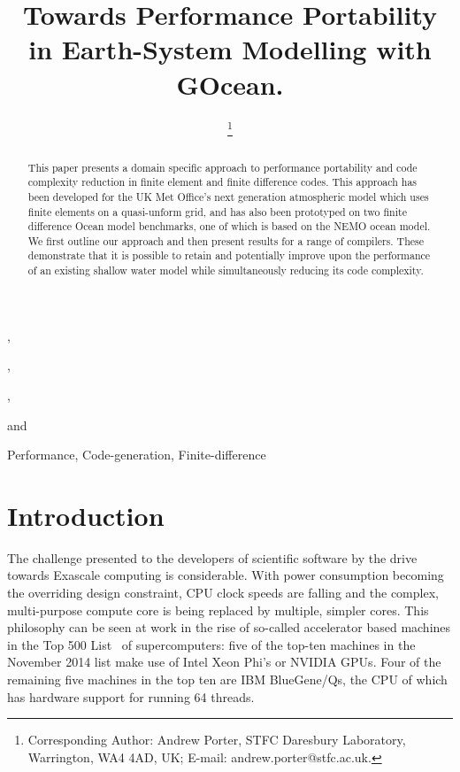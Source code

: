 \documentclass{IOS-Book-Article}
\def\hb{\hbox to 10.7 cm{}}
\begin{document}
\pagestyle{headings}
\def\thepage{}

\begin{frontmatter}              %

\title{Towards Performance Portability in Earth-System Modelling with GOcean.}

\markboth{}{November 2015\hb}

\author[A]{ %
\thanks{Corresponding Author: Andrew Porter, STFC Daresbury Laboratory, Warrington, WA4 4AD, UK; E-mail:
andrew.porter@stfc.ac.uk.}},
\author[A]{ },
\author[A]{ },
\author[A]{ }
and
\author[B]{ }
\address[A]{STFC Daresbury Laboratory, Warrington, WA4 4AD, UK}
\address[B]{IBM}

\begin{abstract}
This paper presents a domain specific approach to performance
portability and code complexity reduction in finite element and finite
difference codes. This approach has been developed for the UK Met
Office's next generation atmospheric model which uses finite elements
on a quasi-unform grid, and has also been prototyped on two finite
difference Ocean model benchmarks, one of which is based on the NEMO
ocean model. We first outline our approach and then present results
for a range of compilers. These demonstrate that it is possible to
retain and potentially improve upon the performance of an existing
shallow water model while simultaneously reducing its code complexity.
\end{abstract}

\begin{keyword}
Performance, Code-generation, Finite-difference
\end{keyword}

\end{frontmatter}
\markboth{November 2015\hb}{November 2015\hb}

\section*{Introduction}

The challenge presented to the developers of scientific software by
the drive towards Exascale computing is considerable. With power
consumption becoming the overriding design constraint, CPU clock
speeds are falling and the complex, multi-purpose compute core is
being replaced by multiple, simpler cores. This philosophy can be seen
at work in the rise of so-called accelerator based machines in the Top
500 List~\cite{top500} of supercomputers: five of the top-ten machines
in the November 2014 list make use of Intel Xeon Phi's or NVIDIA
GPUs. Four of the remaining five machines in the top ten are IBM
BlueGene/Qs, the CPU of which has hardware support for running 64
threads.
\end{document}
